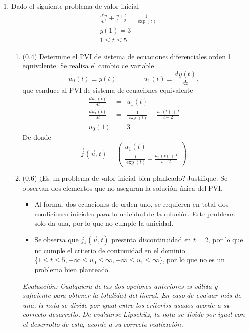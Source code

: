 \documentclass[12pt]{article}
\newcommand{\diff}[3]{\frac{d^{#3}#1}{d#2^{#3}}}
\begin{document}
  \begin{enumerate}[leftmargin=*,widest=9]
    \item Dado el siguiente problema de valor inicial
    \[
    \begin{array}{c}
    \diff{y}{t}{2} + \frac{y+t}{t-2} = \frac{1}{\exp(t)}\\
    y(1) = 3\\
    1 \leq t \leq 5
    \end{array}
    \]
    \begin{enumerate}[label=\alph*]
    \item (\(0.4\)) Determine el PVI de sistema de ecuaciones diferenciales orden 1 equivalente.
   Se realiza el cambio de variable
   \[u_0(t) \equiv y(t) \qquad \qquad u_1(t) \equiv \diff{y(t)}{t}{}, \]
   que conduce al PVI de sistema de ecuaciones equivalente
   \begin{eqnarray*}
   \diff{u_0(t)}{t}{} &=& u_1(t)\\
   \diff{u_1(t)}{t}{} &=& \frac{1}{\exp(t)}-\frac{u_0(t)+t}{t-2}\\
   u_0(1) &=& 3
   \end{eqnarray*}
   De donde
   \[ \vec{f}(\vec{u}, t) = \begin{pmatrix}
   u_1(t) \\ \frac{1}{\exp(t)}-\frac{u_0(t)+t}{t-2}
\end{pmatrix}  .  \]
    \item (\(0.6\)) ¿Es un problema de valor inicial bien planteado? Justifique.
   Se observan dos elementos que no aseguran la solución única del PVI.
   \begin{itemize}
   \item Al formar dos ecuaciones de orden uno, se requieren en total dos condiciones iniciales para la unicidad de la solución. Este problema solo da una, por lo que no cumple la unicidad.
   \item Se observa que \(f_1(\vec{u},t)\) presenta discontinuidad en \(t= 2\), por lo que no cumple el criterio de continuidad en el dominio \(\lbrace 1 \leq t \leq 5, -\infty \leq u_0 \leq \infty, -\infty \leq u_1 \leq \infty \rbrace \), por lo que no es un problema bien planteado.
   \end{itemize}
   \textit{Evaluación: Cualquiera de las dos opciones anteriores es válida y suficiente para obtener la totalidad del literal. En caso de evaluar más de una, la nota se divide por igual entre los criterios usados acorde a su correcto desarrollo. De evaluarse Lipschitz, la nota se divide por igual con el desarrollo de esta, acorde a su correcta realización.}

\end{enumerate}
\end{enumerate}
\end{document}
